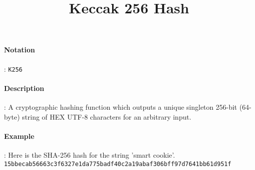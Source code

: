 \documentclass[9pt,a4paper,oneside]{scrartcl}
\author{}
\title{Keccak 256 Hash}
\date{}
\begin{document}
\maketitle
\paragraph{Notation}: \texttt{K256}
\paragraph{Description}: A cryptographic hashing function which outputs a unique singleton 256-bit (64-byte) string of HEX UTF-8 characters for an arbitrary input.
\paragraph{Example}: Here is the SHA-256 hash for the string 'smart cookie'.
	\texttt{15bbecab56663c3f6327e1da775badf40c2a19abaf306bff97d7641bb61d951f}


\printbibliography
\end{document}
